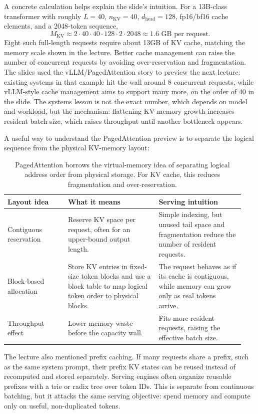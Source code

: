 \documentclass[11pt]{article}
\newcommand{\kv}{\mathrm{KV}}
\begin{document}
A concrete calculation helps explain the slide's intuition.  For a 13B-class transformer with roughly \(L=40\), \(n_{\kv}=40\), \(d_{\mathrm{head}}=128\), fp16/bf16 cache elements, and a 2048-token sequence,
\[
  M_{\kv} \approx
  2 \cdot 40 \cdot 40 \cdot 128 \cdot 2 \cdot 2048
  \approx 1.6 \text{ GB per request}.
\]
Eight such full-length requests require about 13GB of KV cache, matching the memory scale shown in the lecture.  Better cache management can raise the number of concurrent requests by avoiding over-reservation and fragmentation.  The slides used the vLLM/PagedAttention story to preview the next lecture: existing systems in that example hit the wall around 8 concurrent requests, while vLLM-style cache management aims to support many more, on the order of 40 in the slide.  The systems lesson is not the exact number, which depends on model and workload, but the mechanism: flattening KV memory growth increases resident batch size, which raises throughput until another bottleneck appears.

A useful way to understand the PagedAttention preview is to separate the logical sequence from the physical KV-memory layout:
\begin{table}[H]
\centering
\small
\begin{tabular}{@{}L{0.24\linewidth}L{0.36\linewidth}L{0.34\linewidth}@{}}
\toprule
\textbf{Layout idea} & \textbf{What it means} & \textbf{Serving intuition}\\
\midrule
Contiguous reservation & Reserve KV space per request, often for an upper-bound output length. & Simple indexing, but unused tail space and fragmentation reduce the number of resident requests.\\
Block-based allocation & Store KV entries in fixed-size token blocks and use a block table to map logical token order to physical blocks. & The request behaves as if its cache is contiguous, while memory can grow only as real tokens arrive.\\
Throughput effect & Lower memory waste before the capacity wall. & Fits more resident requests, raising the effective batch size.\\
\bottomrule
\end{tabular}
\caption{PagedAttention borrows the virtual-memory idea of separating logical address order from physical storage.  For KV cache, this reduces fragmentation and over-reservation.}
\label{tab:paged-attention-intuition}
\end{table}

The lecture also mentioned prefix caching.  If many requests share a prefix, such as the same system prompt, their prefix KV states can be reused instead of recomputed and stored separately.  Serving engines often organize reusable prefixes with a trie or radix tree over token IDs.  This is separate from continuous batching, but it attacks the same serving objective: spend memory and compute only on useful, non-duplicated tokens.
\end{document}
